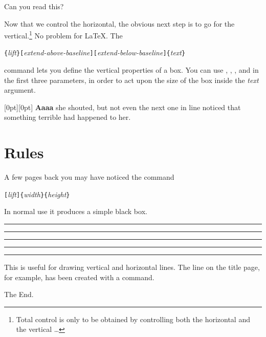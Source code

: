 \begin{example}
\par
{}\par
{} \par
\hspace{1cm} %
 \par
{}
Can you read this?
\end{example}

Now that we control the horizontal, the obvious next step is to go for
the vertical.\footnote{Total control is only to be obtained by
  controlling both the horizontal and the vertical \ldots}
No problem for \LaTeX{}. The

\begin{lscommand}
  \verb|{|\emph{lift}\verb|}[|\emph{extend-above-baseline}\verb|][|\emph{extend-below-baseline}\verb|]{|\emph{text}\verb|}|
\end{lscommand}

\noindent command lets you define the vertical properties of a
box. You can use , , , and
 in the first three parameters, in order to act
upon the size of the box inside the \emph{text} argument.

\begin{example}[examplewidth=0.45\linewidth]
\raisebox{0pt}[0pt][0pt]{\Large%
\textbf{Aaaa\raisebox{-0.3ex}{a}%
\raisebox{-0.7ex}{aa}%
\raisebox{-1.2ex}{r}%
\raisebox{-2.2ex}{g}%
\raisebox{-4.5ex}{h}}}
she shouted, but not even the next
one in line noticed that something
terrible had happened to her.
\end{example}

\section{Rules}\label{sec:rule}

A few pages back you may have noticed the command

\begin{lscommand}
  \verb|[|\emph{lift}\verb|]{|\emph{width}\verb|}{|\emph{height}\verb|}|
\end{lscommand}

\noindent In normal use it produces a simple black box.

\begin{example}
\rule{3mm}{.1pt}%
\rule[-1mm]{5mm}{1cm}%
\rule{3mm}{.1pt}%
\rule[1mm]{1cm}{5mm}%
\rule{3mm}{.1pt}
\end{example}

\noindent This is useful for drawing vertical and horizontal
lines. The line on the title page, for example, has been created with a
 command.

\bigskip
\begin{FlushRight}
  The End.
\end{FlushRight}

%

